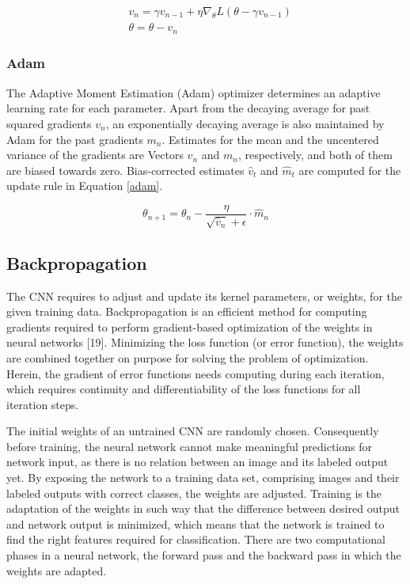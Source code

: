     \begin{equation}
        \begin{aligned}
            & v_n = \gamma v_{n-1} + \eta \nabla_{\theta}L(\theta - \gamma v_{n-1}) \\
            & \theta= \theta - v_{n}
        \end{aligned}
        \label{nag}
    \end{equation}

    \subsubsection{Adam}
    The Adaptive Moment Estimation (Adam) optimizer \cite{DBLP:journals/corr/KingmaB14} determines an adaptive learning rate for each parameter. Apart from the decaying average for past squared gradients $v_n$, an exponentially decaying average is also maintained by Adam for the past gradients $m_n$. Estimates for the mean and the uncentered variance of the gradients are Vectors $v_n$ and $m_n$, respectively, and both of them are biased towards zero. Bias-corrected estimates $\hat{v}_t$ and $\hat{m}_t$ are computed for the update rule in Equation \ref{adam}.

    \begin{equation}
        \theta_{n+1} = \theta_{n} - \frac{\eta}{\sqrt{\hat{v}_n} + \epsilon}\cdot \hat{m}_n
    \end{equation}

    \subsection{Backpropagation}
     The CNN requires to adjust and update its kernel parameters, or weights, for the given training data. Backpropagation\cite{werbos1990backpropagation} is an efficient method for computing gradients required to perform gradient-based optimization of the weights in neural networks [19]. Minimizing the loss function (or error function), the weights are combined together on purpose for solving the problem of optimization. Herein, the gradient of error functions needs computing during each iteration, which requires continuity and differentiability of the loss functions for all iteration steps.

    The initial weights of an untrained CNN are randomly chosen. Consequently before training, the neural network cannot make meaningful predictions for network input, as there is no relation between an image and its labeled output yet. By exposing the network to a training data set, comprising images and their labeled outputs with correct classes, the weights are adjusted. Training is the adaptation of the weights in such way that the difference between desired output and network output is minimized, which means that the network is trained to find the right features required for classification. There are two computational phases in a neural network, the forward pass and the backward pass in which the weights are adapted.

